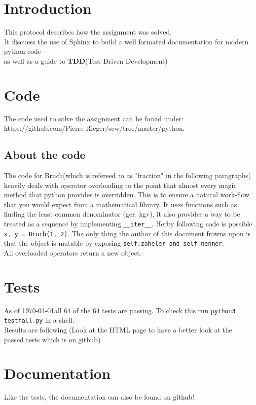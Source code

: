 \documentclass[letterpaper, 12pt]{article}
\begin{document}
\section{Introduction}
This protocol describes how the assignment was solved. \\
It discuess the use of Sphinx to build a well formated documentation for modern python code \\
as well as a guide to \textbf{TDD}(Test Driven Development)

\section{Code}
The code used to solve the assignment can be found under: \\
https://github.com/Pierre-Rieger/sew/tree/master/python. \\

\subsection{About the code}
The code for Bruch(which is refereed to as "fraction" in the following paragraphs) heavily deals with operator overloading to the point that 
almost every magic method that python provides is overridden. This is to ensure a natural work-flow that you would expect from a mathematical library.
It uses functions such as finding the least common denominator (ger: kgv), it also provides a way to be treated as a sequence by implementing \verb|__iter__|.
Herby following code is possible \verb|x, y = Bruch(1, 2)|.
The only thing the author of this document frowns upon is that the object is mutable by exposing \verb|self.zaheler and self.nenner|.\\

All overloaded operators return a new object.

\section{Tests}
As of \today all 64 of the 64 tests are passing.
To check this run \verb|python3 testfall.py| in a shell. \\
Results are following (Look at the HTML page to have a better look at the passed tests which is on github)\\


\section{Documentation}
Like the tests, the documentation can also be found on github!



\clearpage



\listoftables
\lstlistoflistings
\listoffigures


	
\end{document}
